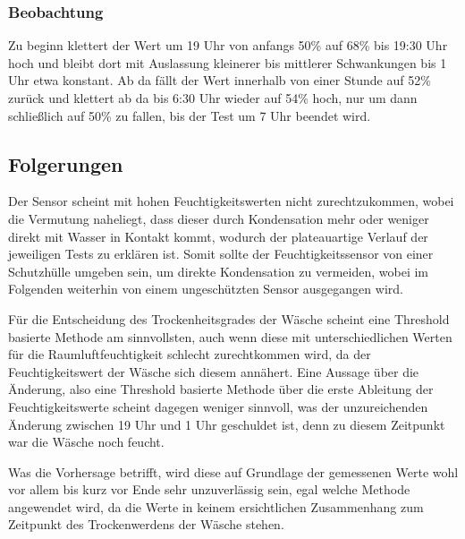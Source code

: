 \newpage
\subsubsection{Beobachtung}
Zu beginn klettert der Wert um 19 Uhr von anfangs 50\% auf 68\% bis 19:30 Uhr hoch und bleibt dort mit Auslassung kleinerer bis mittlerer Schwankungen bis 1 Uhr etwa konstant. Ab da fällt der Wert innerhalb von einer Stunde auf 52\% zurück und klettert ab da bis 6:30 Uhr wieder auf 54\% hoch, nur um dann schließlich auf 50\% zu fallen, bis der Test um 7 Uhr beendet wird.

\subsection{Folgerungen}
Der Sensor scheint mit hohen Feuchtigkeitswerten nicht zurechtzukommen, wobei die Vermutung naheliegt, dass dieser durch Kondensation mehr oder weniger direkt mit Wasser in Kontakt kommt, wodurch der plateauartige Verlauf der jeweiligen Tests zu erklären ist. Somit sollte der Feuchtigkeitssensor von einer Schutzhülle umgeben sein, um direkte Kondensation zu vermeiden, wobei im Folgenden weiterhin von einem ungeschützten Sensor ausgegangen wird.

Für die Entscheidung des Trockenheitsgrades der Wäsche scheint eine Threshold basierte Methode am sinnvollsten, auch wenn diese mit unterschiedlichen Werten für die Raumluftfeuchtigkeit schlecht zurechtkommen wird, da der Feuchtigkeitswert der Wäsche sich diesem annähert. Eine Aussage über die Änderung, also eine Threshold basierte Methode über die erste Ableitung der Feuchtigkeitswerte scheint dagegen weniger sinnvoll, was der unzureichenden Änderung zwischen 19 Uhr und 1 Uhr geschuldet ist, denn zu diesem Zeitpunkt war die Wäsche noch feucht.

Was die Vorhersage betrifft, wird diese auf Grundlage der gemessenen Werte wohl vor allem bis kurz vor Ende sehr unzuverlässig sein, egal welche Methode angewendet wird, da die Werte in keinem ersichtlichen Zusammenhang zum Zeitpunkt des Trockenwerdens der Wäsche stehen.